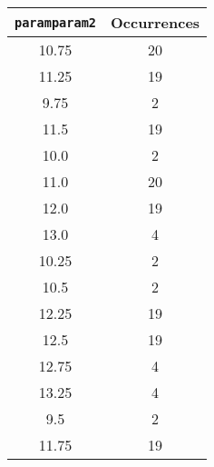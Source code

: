 \documentclass[letterpaper, 12pt]{article}
\begin{document}
\begin{longtable}{|c|c|}
\hline
\textbf{\texttt{paramparam2}} & \textbf{Occurrences} \\
\hline
10.75 & 20 \\
\hline
11.25 & 19 \\
\hline
9.75 & 2 \\
\hline
11.5 & 19 \\
\hline
10.0 & 2 \\
\hline
11.0 & 20 \\
\hline
12.0 & 19 \\
\hline
13.0 & 4 \\
\hline
10.25 & 2 \\
\hline
10.5 & 2 \\
\hline
12.25 & 19 \\
\hline
12.5 & 19 \\
\hline
12.75 & 4 \\
\hline
13.25 & 4 \\
\hline
9.5 & 2 \\
\hline
11.75 & 19 \\
\hline
\end{longtable}
\end{document}
